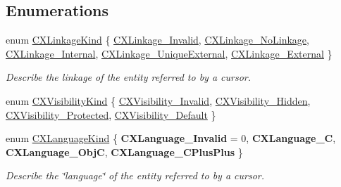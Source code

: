 \subsection*{Enumerations}
\begin{DoxyCompactItemize}
\item 
enum \hyperlink{group__CINDEX__CURSOR__MANIP_gace57c68a7a11b0967b184a7ef9fbeb9e}{C\+X\+Linkage\+Kind} \{ \newline
\hyperlink{group__CINDEX__CURSOR__MANIP_ggace57c68a7a11b0967b184a7ef9fbeb9ea1c74a361e26875b381058ab768bc3f37}{C\+X\+Linkage\+\_\+\+Invalid}, 
\hyperlink{group__CINDEX__CURSOR__MANIP_ggace57c68a7a11b0967b184a7ef9fbeb9ea101d38b657f24fca614f7b2586eab0c9}{C\+X\+Linkage\+\_\+\+No\+Linkage}, 
\hyperlink{group__CINDEX__CURSOR__MANIP_ggace57c68a7a11b0967b184a7ef9fbeb9ea38be5867a179378b8262355e2f0b9685}{C\+X\+Linkage\+\_\+\+Internal}, 
\hyperlink{group__CINDEX__CURSOR__MANIP_ggace57c68a7a11b0967b184a7ef9fbeb9ea6f53727f7dc5b57c4ae19f73bad12ef9}{C\+X\+Linkage\+\_\+\+Unique\+External}, 
\newline
\hyperlink{group__CINDEX__CURSOR__MANIP_ggace57c68a7a11b0967b184a7ef9fbeb9ea391eb2ceea056e376acbb9031a4f1722}{C\+X\+Linkage\+\_\+\+External}
 \}\begin{DoxyCompactList}\small\item\em Describe the linkage of the entity referred to by a cursor. \end{DoxyCompactList}
\item 
enum \hyperlink{group__CINDEX__CURSOR__MANIP_gaf92fafb489ab66529aceab51818994cb}{C\+X\+Visibility\+Kind} \{ \hyperlink{group__CINDEX__CURSOR__MANIP_ggaf92fafb489ab66529aceab51818994cbad1ed3fb95497edcf52350079fca2d40e}{C\+X\+Visibility\+\_\+\+Invalid}, 
\hyperlink{group__CINDEX__CURSOR__MANIP_ggaf92fafb489ab66529aceab51818994cba3f73acbdefbcec3e281e16141e8fb105}{C\+X\+Visibility\+\_\+\+Hidden}, 
\hyperlink{group__CINDEX__CURSOR__MANIP_ggaf92fafb489ab66529aceab51818994cba16a29f348585b873fdf5d84f0875bb95}{C\+X\+Visibility\+\_\+\+Protected}, 
\hyperlink{group__CINDEX__CURSOR__MANIP_ggaf92fafb489ab66529aceab51818994cba9ddb2c356afa2f2ac72ef0e2cf71575b}{C\+X\+Visibility\+\_\+\+Default}
 \}
\item 
\mbox{\label{group__CINDEX__CURSOR__MANIP_ga3abfddcec8a46e7156f37de661af3c14}} 
enum \hyperlink{group__CINDEX__CURSOR__MANIP_ga3abfddcec8a46e7156f37de661af3c14}{C\+X\+Language\+Kind} \{ {\bfseries C\+X\+Language\+\_\+\+Invalid} = 0, 
{\bfseries C\+X\+Language\+\_\+C}, 
{\bfseries C\+X\+Language\+\_\+\+ObjC}, 
{\bfseries C\+X\+Language\+\_\+\+C\+Plus\+Plus}
 \}\begin{DoxyCompactList}\small\item\em Describe the \char`\"{}language\char`\"{} of the entity referred to by a cursor. \end{DoxyCompactList}
\end{DoxyCompactItemize}
